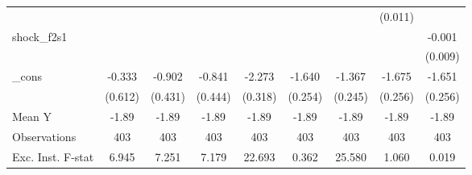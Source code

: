 {\begin{tabular}{l*{8}{c}}
            &                     &                     &                     &                     &                     &                     &     (0.011)         &                     \\
\addlinespace
shock\_f2s1  &                     &                     &                     &                     &                     &                     &                     &      -0.001         \\
            &                     &                     &                     &                     &                     &                     &                     &     (0.009)         \\
\addlinespace
\_cons      &      -0.333         &      -0.902\sym{**} &      -0.841\sym{*}  &      -2.273\sym{***}&      -1.640\sym{***}&      -1.367\sym{***}&      -1.675\sym{***}&      -1.651\sym{***}\\
            &     (0.612)         &     (0.431)         &     (0.444)         &     (0.318)         &     (0.254)         &     (0.245)         &     (0.256)         &     (0.256)         \\
\midrule
Mean Y      &       -1.89         &       -1.89         &       -1.89         &       -1.89         &       -1.89         &       -1.89         &       -1.89         &       -1.89         \\
Observations&         403         &         403         &         403         &         403         &         403         &         403         &         403         &         403         \\
Exc. Inst. F-stat&       6.945         &       7.251         &       7.179         &      22.693         &       0.362         &      25.580         &       1.060         &       0.019         \\
\bottomrule
\end{tabular}
}
